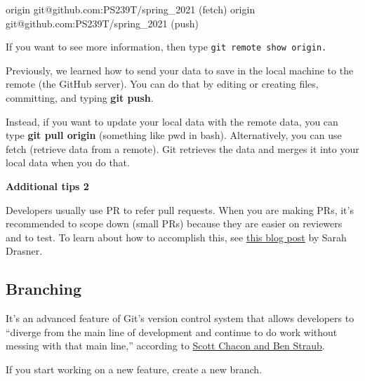 \documentclass[
  letterpaper,
  DIV=11,
  numbers=noendperiod]{scrreprt}
\newenvironment{Shaded}{\begin{snugshade}}{\end{snugshade}}
\newcommand{\ErrorTok}[1]{\textcolor[rgb]{0.68,0.00,0.00}{#1}}
\newcommand{\ExtensionTok}[1]{\textcolor[rgb]{0.00,0.23,0.31}{#1}}
\newcommand{\KeywordTok}[1]{\textcolor[rgb]{0.00,0.23,0.31}{#1}}
\newcommand{\NormalTok}[1]{\textcolor[rgb]{0.00,0.23,0.31}{#1}}
\begin{document}
\begin{Shaded}
\begin{Highlighting}[]
\ExtensionTok{origin}\NormalTok{  git@github.com:PS239T/spring\_2021 }\ErrorTok{(}\ExtensionTok{fetch}\KeywordTok{)}
\ExtensionTok{origin}\NormalTok{  git@github.com:PS239T/spring\_2021 }\ErrorTok{(}\ExtensionTok{push}\KeywordTok{)}
\end{Highlighting}
\end{Shaded}

If you want to see more information, then type
\texttt{git\ remote\ show\ origin.}

Previously, we learned how to send your data to save in the local
machine to the remote (the GitHub server). You can do that by editing or
creating files, committing, and typing \textbf{git push}.

Instead, if you want to update your local data with the remote data, you
can type \textbf{git pull origin} (something like pwd in bash).
Alternatively, you can use fetch (retrieve data from a remote). Git
retrieves the data and merges it into your local data when you do that.

\begin{Shaded}
\end{Shaded}

\textbf{Additional tips 2}

Developers usually use PR to refer pull requests. When you are making
PRs, it's recommended to scope down (small PRs) because they are easier
on reviewers and to test. To learn about how to accomplish this, see
\href{https://www.netlify.com/blog/2020/03/31/how-to-scope-down-prs/}{this
blog post} by Sarah Drasner.

\hypertarget{branching}{%
\subsection*{Branching}\label{branching}}

It's an advanced feature of Git's version control system that allows
developers to ``diverge from the main line of development and continue
to do work without messing with that main line,'' according to
\href{https://git-scm.com/book/en/v1/Git-Branching}{Scott Chacon and Ben
Straub}.

If you start working on a new feature, create a new branch.
\end{document}
